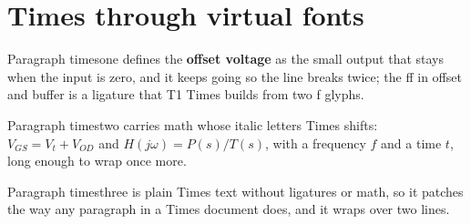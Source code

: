 \documentclass[11pt]{article}
\begin{document}
\section*{Times through virtual fonts}

Paragraph timesone defines the \textbf{offset voltage} as the small output that stays when the input is
zero, and it keeps going so the line breaks twice; the ff in offset and buffer is a ligature that T1 Times
builds from two f glyphs.

Paragraph timestwo carries math whose italic letters Times shifts: $V_{GS} = V_{t} + V_{OD}$ and
$H(j\omega) = P(s)/T(s)$, with a frequency $f$ and a time $t$, long enough to wrap once more.

Paragraph timesthree is plain Times text without ligatures or math, so it patches the way any paragraph
in a Times document does, and it wraps over two lines.
\end{document}
